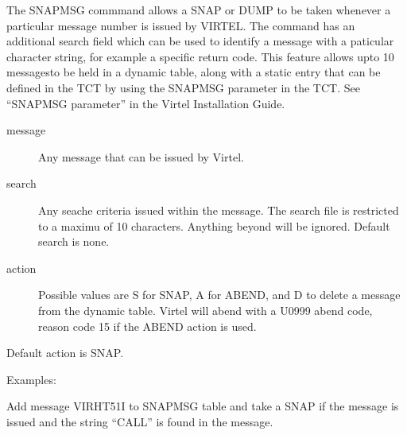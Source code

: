 \documentclass[letterpaper,10pt,english]{sphinxmanual}
\begin{document}
\begin{sphinxVerbatim}[commandchars=\\\{\}]
\PYG{p}{[} \PYG{p}{]}
\end{sphinxVerbatim}

The SNAPMSG commmand allows a SNAP or DUMP to be taken whenever a particular message number is issued by VIRTEL. The command has an additional search field which can be used to identify a message with a paticular character string, for example a specific return code. This feature allows upto 10 messagesto be held in a dynamic table, along with a static entry that can be defined in the TCT by using the SNAPMSG parameter in the TCT. See “SNAPMSG parameter” in the Virtel Installation Guide.
\begin{description}
\item[{message}] \leavevmode
Any message that can be issued by Virtel.

\item[{search}] \leavevmode
Any seache criteria issued within the message. The search file is restricted to a maximu of 10 characters. Anything beyond will be ignored. Default search is none.

\item[{action}] \leavevmode
Possible values are S for SNAP, A for ABEND, and D to delete a message from the dynamic table. Virtel will abend with a U0999 abend code, reason code 15 if the ABEND action is used.

\end{description}

Default action is SNAP.

Examples:

\begin{sphinxVerbatim}[commandchars=\\\{\}]
 
\end{sphinxVerbatim}

Add message VIRHT51I to SNAPMSG table and take a SNAP if the message is issued and the string “CALL” is found in the message.

\begin{sphinxVerbatim}[commandchars=\\\{\}]
 
\end{sphinxVerbatim}
\end{document}
